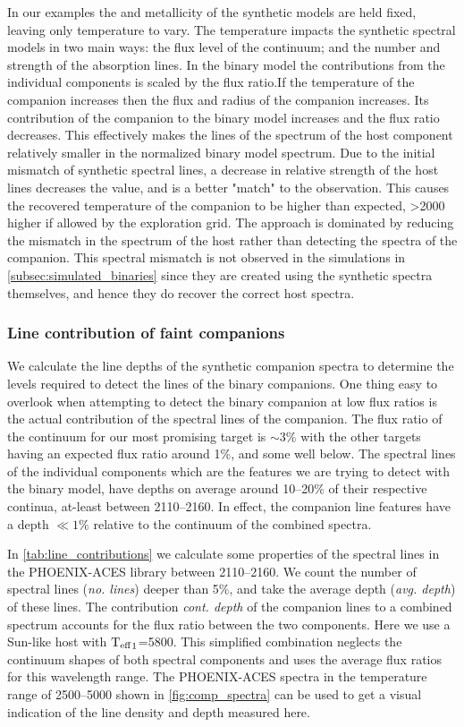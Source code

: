 In our examples the \logg{} and metallicity of the synthetic models are held fixed, leaving only temperature to vary.
The temperature impacts the synthetic spectral models in two main ways: the flux level of the continuum; and the number and strength of the absorption lines.
In the binary model the contributions from the individual components is scaled by the flux ratio.If the temperature of the companion increases then the flux and radius of the companion increases.
Its contribution of the companion to the binary model increases and the flux ratio \FoneFtwo{} decreases.
This effectively makes the lines of the spectrum of the host component relatively smaller in the normalized binary model spectrum.
Due to the initial mismatch of synthetic spectral lines, a decrease in relative strength of the host lines decreases the \textchisquared{} value, and is a better "match" to the observation.
This causes the recovered temperature of the companion to be higher than expected, >2000\K{} higher if allowed by the exploration grid.
The \textchisquared{} approach is dominated by reducing the mismatch in the spectrum of the host rather than detecting the spectra of the companion.
This spectral mismatch is not observed in the simulations in \cref{subsec:simulated_binaries} since they are created using the synthetic spectra themselves, and hence they do recover the correct host spectra.


\subsubsection{Line contribution of faint companions}
\label{subsubsec:line_contributions}
We calculate the line depths of the synthetic companion spectra to determine the \snr{} levels required to detect the lines of the binary companions.
One thing easy to overlook when attempting to detect the binary companion at low flux ratios is the actual contribution of the spectral lines of the companion.
The flux ratio of the continuum for our most promising target is \FtwoFone{}\(\sim\)3\% with the other targets having an expected flux ratio around 1\%, and some well below.
The spectral lines of the individual components which are the features we are trying to detect with the binary model, have depths on average around 10--20\% of their respective continua,  at-least between 2110--2160\nm{}.
In effect, the companion line features have a depth \(\ll 1\%\) relative to the continuum of the combined spectra.

In \cref{tab:line_contributions} we calculate some properties of the spectral lines in the {PHOENIX-ACES} library between 2110--2160\nm{}.
We count the number of spectral lines (\emph{no. lines}) deeper than 5\%, and take the average depth (\emph{avg. depth}) of these lines.
The contribution \emph{cont. depth} of the companion lines to a combined spectrum accounts for the flux ratio between the two components.
Here we use a Sun-like host with \({\textrm{T}_{\mathrm{eff}}}_{1}\)=5800\K{}.
This simplified combination neglects the continuum shapes of both spectral components and uses the average flux ratios for this wavelength range.
The {PHOENIX-ACES} spectra in the temperature range of 2500--5000\K{} shown in \cref{fig:comp_spectra} can be used to get a visual indication of the line density and depth measured here.


